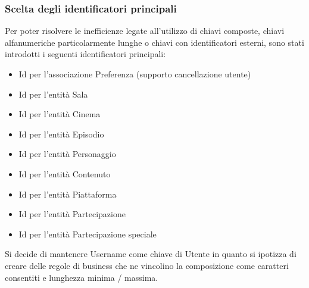 \documentclass[a4paper]{article}
\begin{document}
\subsubsection{Scelta degli identificatori principali}
Per poter risolvere le inefficienze legate all'utilizzo di chiavi composte,
chiavi alfanumeriche particolarmente lunghe o chiavi con identificatori esterni,
sono stati introdotti i seguenti identificatori principali:
\begin{itemize}
  \item Id per l'associazione Preferenza (supporto cancellazione utente)\\ 
  \item Id per l'entità Sala \\
  \item Id per l'entità Cinema \\
  \item Id per l'entità Episodio\\
  \item Id per l'entità Personaggio\\
  \item Id per l'entità Contenuto\\
  \item Id per l'entità Piattaforma\\
  \item Id per l'entità Partecipazione\\
  \item Id per l'entità Partecipazione speciale\\
\end{itemize}

Si decide di mantenere Username come chiave di Utente in quanto si ipotizza di creare delle regole di business
che ne vincolino la composizione come caratteri consentiti e lunghezza minima / massima.\\
\end{document}
